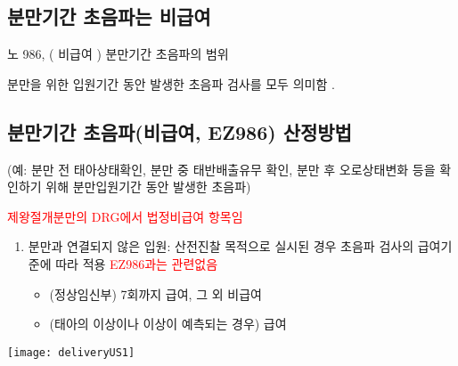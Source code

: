 \subsection*{분만기간 초음파는 비급여}
노 986, ( 비급여 ) 분만기간 초음파의 범위 \par
\noindent 분만을 위한 입원기간 동안 발생한 초음파 검사를 모두 의미함 .
\prezi{\clearpage}
\subsection{분만기간 초음파(비급여, EZ986) 산정방법}
(예: 분만 전 태아상태확인, 분만 중 태반배출유무 확인, 분만 후 오로상태변화 등을 확인하기 위해 분만입원기간 동안 발생한 초음파)\par
\LARGE \textcolor{red}{제왕절개분만의 DRG에서 법정비급여 항목임} \normalsize
 
\begin{enumerate}[1)]\tightlist
\item 분만과 연결되지 않은 입원: 산전진찰 목적으로 실시된 경우 초음파 검사의 급여기준에 따라 적용 \textcolor{red}{EZ986과는 관련없음}
	\begin{itemize}[-]\tightlist
	\item (정상임신부) 7회까지 급여, 그 외 비급여
    \item (태아의 이상이나 이상이 예측되는 경우) 급여
	\end{itemize}
\end{enumerate} 
\prezi{\clearpage}
\texttt{[image: deliveryUS1]}